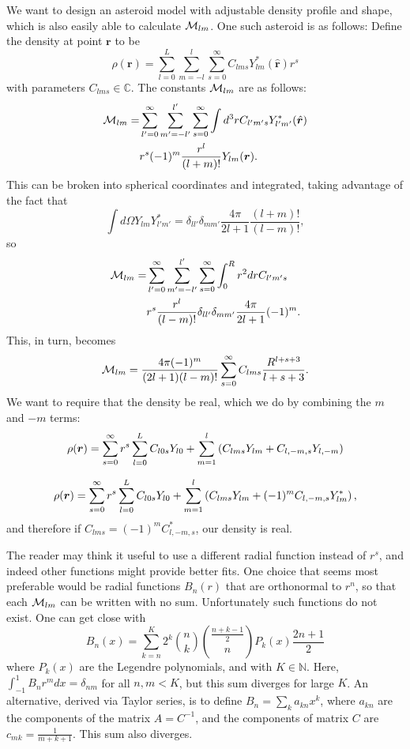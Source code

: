 \documentclass[aps,twocolumn,secnumarabic,balancelastpage,amsmath,amssymb,nofootinbib,floatfix]{revtex4-1}
\begin{document}
We want to design an asteroid model with adjustable density profile and shape, which is also easily able to calculate $\mathcal{M}_{lm}$. One such asteroid is as follows:
Define the density at point $\bm r$ to be
$$\rho(\bm r) = \sum_{l=0}^L \sum_{m=-l}^l \sum_{s=0}^\infty C_{lms}Y^*_{lm}(\hat{\bm r})r^s$$
with parameters $C_{lms} \in \mathbb{C}$. The constants $\mathcal{M}_{lm}$ are as follows:
\begin{equation*}
\begin{aligned}\mathcal{M}_{lm} = &\sum_{l'=0}^\infty \sum_{m'=-l'}^{l'} \sum_{s=0}^\infty\int d^3 r  C_{l'm's}Y^*_{l'm'}(\hat{\bm r})\\
&r^s (-1)^m \frac{r^l}{(l+m)!}Y_{lm}(\bm r).
\end{aligned}
\end{equation*}
This can be broken into spherical coordinates and integrated, taking advantage of the fact that
$$\int d\Omega Y_{lm}Y^*_{l'm'}=\delta_{ll'}\delta_{mm'}\frac{4\pi}{2l+1}\frac{(l+m)!}{(l-m)!},$$
so
\begin{equation*}
\begin{aligned}\mathcal{M}_{lm} = &\sum_{l'=0}^\infty \sum_{m'=-l'}^{l'} \sum_{s=0}^\infty\int_0^R r^2 dr  C_{l'm's}\\
&r^s \frac{r^l}{(l-m)!}\delta_{ll'}\delta_{mm'}\frac{4\pi}{2l+1}(-1)^m.
\end{aligned}
\end{equation*}
This, in turn, becomes
$$\mathcal{M}_{lm} = \frac{4\pi (-1)^m}{(2l+1)(l-m)!}\sum_{s=0}^\infty C_{lms} \frac{R^{l+s+3}}{l+s+3}.$$
We want to require that the density be real, which we do by combining the $m$ and $-m$ terms:
$$\rho(\bm r) =  \sum_{s=0}^\infty r^s\sum_{l=0}^L C_{l0s}Y_{l0} + \sum_{m=1}^l \left( C_{lms}Y_{lm} + C_{l,-m,s}Y_{l,-m} \right)$$

$$\rho(\bm r) =  \sum_{s=0}^\infty r^s\sum_{l=0}^L C_{l0s}Y_{l0} + \sum_{m=1}^l \left( C_{lms}Y_{lm} + (-1)^m C_{l,-m,s}Y^*_{lm} \right),$$
and therefore if $C_{lms} = (-1)^m C_{l,-m,s}^*$, our density is real.

The reader may think it useful to use a different radial function instead of $r^s$, and indeed other functions might provide better fits. One choice that seems most preferable would be radial functions $B_{n}(r)$ that are orthonormal to $r^n$, so that each $\mathcal{M}_{lm}$ can be written with no sum. Unfortunately such functions do not exist. One can get close with
$$B_n(x)=\sum_{k=n}^K 2^k \binom{n}{k} \binom{\frac{n+k-1}{2}}{n}P_k(x)\frac{2n + 1}{2}$$
where $P_k(x)$ are the Legendre polynomials, and with $K \in \mathbb{N}$. Here, $\int_{-1}^1 B_n r^m dx = \delta_{nm}$ for all $n, m < K$, but this sum diverges for large $K$. An alternative, derived via Taylor series, is to define $B_n = \sum_k a_{kn}x^k$, where $a_{kn}$ are the components of the matrix $A=C^{-1}$, and the components of matrix $C$ are $c_{mk}=\frac{1}{m+k+1}$. This sum also diverges.
\end{document}
